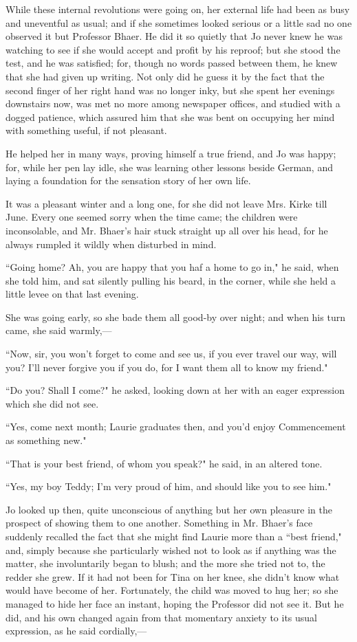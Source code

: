 While these internal revolutions were going on, her external life had
been as busy and uneventful as usual; and if she sometimes looked
serious or a little sad no one observed it but Professor Bhaer. He did
it so quietly that Jo never knew he was watching to see if she would
accept and profit by his reproof; but she stood the test, and he was
satisfied; for, though no words passed between them, he knew that she
had given up writing. Not only did he guess it by the fact that the
second finger of her right hand was no longer inky, but she spent her
evenings downstairs now, was met no more among newspaper offices, and
studied with a dogged patience, which assured him that she was bent on
occupying her mind with something useful, if not pleasant.

He helped her in many ways, proving himself a true friend, and Jo was
happy; for, while her pen lay idle, she was learning other lessons
beside German, and laying a foundation for the sensation story of her
own life.

It was a pleasant winter and a long one, for she did not leave Mrs.
Kirke till June. Every one seemed sorry when the time came; the children
were inconsolable, and Mr. Bhaer's hair stuck straight
up all over his head, for he always rumpled it wildly when disturbed in
mind.

``Going home? Ah, you are happy that you haf a home to go in," he said,
when she told him, and sat silently pulling his beard, in the corner,
while she held a little levee on that last evening.

She was going early, so she bade them all good-by over night; and when
his turn came, she said warmly,---

``Now, sir, you won't forget to come and see us, if you
ever travel our way, will you? I'll never forgive you if
you do, for I want them all to know my friend."

``Do you? Shall I come?" he asked, looking down at her with an eager
expression which she did not see.

``Yes, come next month; Laurie graduates then, and you'd
enjoy Commencement as something new."

``That is your best friend, of whom you speak?" he said, in an altered
tone.

``Yes, my boy Teddy; I'm very proud of him, and should
like you to see him."

Jo looked up then, quite unconscious of anything but her own pleasure in
the prospect of showing them to one another. Something in Mr.
Bhaer's face suddenly recalled the fact that she might
find Laurie more than a ``best friend," and, simply because she
particularly wished not to look as if anything was the matter, she
involuntarily began to blush; and the more she tried not to, the redder
she grew. If it had not been for Tina on her knee, she
didn't know what would have become of her. Fortunately,
the child was moved to hug her; so she managed to hide her face an
instant, hoping the Professor did not see it. But he did, and his own
changed again from that momentary anxiety to its usual expression, as he
said cordially,---

